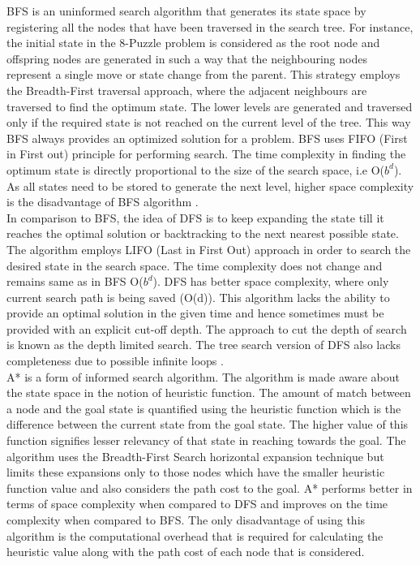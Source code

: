 \documentclass{svproc}
\begin{document}
\noindent BFS is an uninformed search algorithm that generates its state space by registering all the nodes that have been traversed in the search tree. For instance, the initial state in the 8-Puzzle problem is considered as the root node and offspring nodes are generated in such a way that the neighbouring nodes represent a single move or state change from the parent. This strategy employs the Breadth-First traversal approach, where the adjacent neighbours are traversed to find the optimum state. The lower levels are generated and traversed only if the required state is not reached on the current level of the tree. This way BFS always provides an optimized solution for a problem. BFS uses FIFO (First in First out) principle for performing search. The time complexity in finding the optimum state is directly proportional to the size of the search space, i.e O($b^{d}$). As all states need to be stored to generate the next level, higher space complexity is the disadvantage of BFS algorithm \cite{tab}.\\

\noindent In comparison to BFS, the idea of DFS is to keep expanding the state till it reaches the optimal solution or backtracking to the next nearest possible state. The algorithm employs LIFO (Last in First Out) approach in order to search the desired state in the search space. The time complexity does not change and remains same as in BFS O($b^{d}$). DFS has better space complexity, where only current search path is being saved (O(d)). This algorithm lacks the ability to provide an optimal solution in the given time and hence sometimes must be provided with an explicit cut-off depth. The approach to cut the depth of search is known as the depth limited search. The tree search version of DFS also lacks completeness due to possible infinite loops \cite{rus}.\\

\noindent A* is a form of informed search algorithm. The algorithm is made aware about the state space in the notion of heuristic function. The amount of match between a node and the goal state is quantified using the heuristic function which is the difference between the current state from the goal state. The higher value of this function signifies lesser relevancy of that state in reaching towards the goal. The algorithm uses the Breadth-First Search horizontal expansion technique but limits these expansions only to those nodes which have the smaller heuristic function value and also considers the path cost to the goal. A* performs better in terms of space complexity when compared to DFS  and  improves on the time complexity  when compared to BFS. The only disadvantage of using this algorithm is the computational overhead that is required for calculating the heuristic value along with the path cost of each node that is considered.\\
\end{document}
